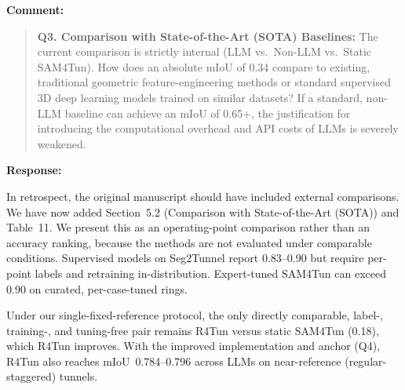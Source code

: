 \documentclass[11pt,a4paper]{article}
\newcommand{\MSSOTATable}{Table~11}
\newenvironment{commentblock}{%
  \par\smallskip\noindent\textbf{Comment:}\par
  \begin{quote}\itshape\color{black}
}{%
  \end{quote}\smallskip
}
\newenvironment{responseblock}{%
  \par\smallskip\noindent\textbf{Response:}\par
  \begingroup\color{responsegreen}
}{%
  \endgroup\smallskip
}
\begin{document}
\begin{commentblock}
\textbf{Q3. Comparison with State-of-the-Art (SOTA) Baselines:} The current comparison is strictly internal (LLM vs.\ Non-LLM vs.\ Static SAM4Tun). How does an absolute mIoU of 0.34 compare to existing, traditional geometric feature-engineering methods or standard supervised 3D deep learning models trained on similar datasets? If a standard, non-LLM baseline can achieve an mIoU of 0.65+, the justification for introducing the computational overhead and API costs of LLMs is severely weakened.
\end{commentblock}
\begin{responseblock}
In retrospect, the original manuscript should have included external comparisons. We have now added Section~5.2 (Comparison with State-of-the-Art (SOTA)) and \MSSOTATable. We present this as an operating-point comparison rather than an accuracy ranking, because the methods are not evaluated under comparable conditions. Supervised models on Seg2Tunnel report 0.83--0.90 but require per-point labels and retraining in-distribution. Expert-tuned SAM4Tun can exceed 0.90 on curated, per-case-tuned rings.

Under our single-fixed-reference protocol, the only directly comparable, label-, training-, and tuning-free pair remains R4Tun versus static SAM4Tun (0.18), which R4Tun improves. With the improved implementation and anchor (Q4), R4Tun also reaches mIoU~0.784--0.796 across LLMs on near-reference (regular-staggered) tunnels.


\end{responseblock}
\end{document}
